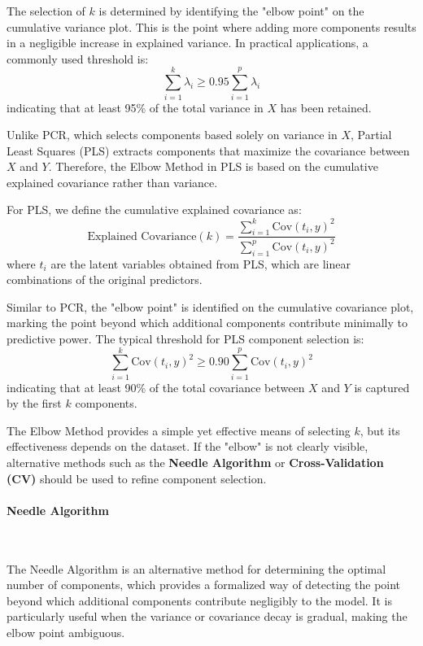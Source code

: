 \documentclass[11pt,twoside,a4paper]{article}
\begin{document}
The selection of \( k \) is determined by identifying the "elbow point" on the cumulative variance plot. This is the point where adding more components results in a negligible increase in explained variance. In practical applications, a commonly used threshold is:
\begin{equation}
\sum_{i=1}^{k} \lambda_i \geq 0.95 \sum_{i=1}^{p} \lambda_i
\end{equation}
indicating that at least 95\% of the total variance in \( X \) has been retained.

Unlike PCR, which selects components based solely on variance in \( X \), Partial Least Squares (PLS) extracts components that maximize the covariance between \( X \) and \( Y \). Therefore, the Elbow Method in PLS is based on the cumulative explained covariance rather than variance.

For PLS, we define the cumulative explained covariance as:
\begin{equation}
\text{Explained Covariance}(k) = \frac{\sum_{i=1}^{k} \text{Cov}(t_i, y)^2}{\sum_{i=1}^{p} \text{Cov}(t_i, y)^2}
\end{equation}
where \( t_i \) are the latent variables obtained from PLS, which are linear combinations of the original predictors.

Similar to PCR, the "elbow point" is identified on the cumulative covariance plot, marking the point beyond which additional components contribute minimally to predictive power. The typical threshold for PLS component selection is:
\begin{equation}
\sum_{i=1}^{k} \text{Cov}(t_i, y)^2 \geq 0.90 \sum_{i=1}^{p} \text{Cov}(t_i, y)^2
\end{equation}
indicating that at least 90\% of the total covariance between \( X \) and \( Y \) is captured by the first \( k \) components.

The Elbow Method provides a simple yet effective means of selecting \( k \), but its effectiveness depends on the dataset. If the "elbow" is not clearly visible, alternative methods such as the \textbf{Needle Algorithm} or \textbf{Cross-Validation (CV)} should be used to refine component selection.

\paragraph {Needle Algorithm} \ \

The Needle Algorithm is an alternative method for determining the optimal number of components, which provides a formalized way of detecting the point beyond which additional components contribute negligibly to the model. It is particularly useful when the variance or covariance decay is gradual, making the elbow point ambiguous.
\end{document}
